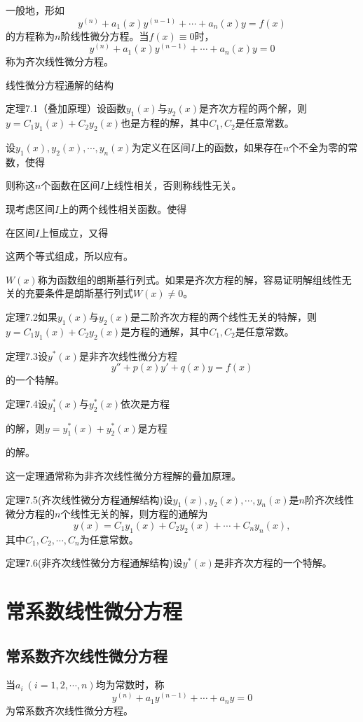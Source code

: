 一般地，形如
\[
y^{(n)}+a_1(x)y^{(n-1)}+\cdots+a_n(x)y=f(x)
\]
的方程称为$n$阶线性微分方程。当$f(x)\equiv0$时，
\[
y^{(n)}+a_1(x)y^{(n-1)}+\cdots+a_n(x)y=0
\]
称为齐次线性微分方程。

\noindent 线性微分方程通解的结构

定理7.1（叠加原理）\quad 设函数$y_1(x)$与$y_2(x)$是齐次方程的两个解，则$y=C_1y_1(x)+C_2y_2(x)$也是方程的解，其中$C_1,C_2$是任意常数。

设$y_1(x),y_2(x),\cdots,y_n(x)$为定义在区间$I$上的函数，如果存在$n$个不全为零的常数，使得

则称这$n$个函数在区间$I$上线性相关，否则称线性无关。

现考虑区间$I$上的两个线性相关函数。使得

在区间$I$上恒成立，又得

这两个等式组成，所以应有。

$W(x)$称为函数组的朗斯基行列式。如果是齐次方程的解，容易证明解组线性无关的充要条件是朗斯基行列式$W(x)\neq0$。

定理7.2\quad 如果$y_1(x)$与$y_2(x)$是二阶齐次方程的两个线性无关的特解，则$y=C_1y_1(x)+C_2y_2(x)$是方程的通解，其中$C_1,C_2$是任意常数。

定理7.3\quad 设$y^{*}(x)$是非齐次线性微分方程
\[
y''+p(x)y'+q(x)y=f(x)
\]
的一个特解。

定理7.4\quad 设$y_1^{*}(x)$与$y_2^{*}(x)$依次是方程

的解，则$y=y_1^{*}(x)+y_2^{*}(x)$是方程

的解。

这一定理通常称为非齐次线性微分方程解的叠加原理。

定理7.5(齐次线性微分方程通解结构)\quad 设$y_1(x),y_2(x),\cdots,y_n(x)$是$n$阶齐次线性微分方程的$n$个线性无关的解，则方程的通解为
\[
y(x)=C_1y_1(x)+C_2y_2(x)+\cdots+C_ny_n(x),
\]
其中$C_1,C_2,\cdots,C_n$为任意常数。

定理7.6(非齐次线性微分方程通解结构)\quad 设$y^{*}(x)$是非齐次方程的一个特解。

\section{常系数线性微分方程}
\subsection{常系数齐次线性微分方程}

当$a_i\ (i=1,2,\cdots,n)$均为常数时，称
\[
y^{(n)}+a_1y^{(n-1)}+\cdots+a_ny=0
\]
为常系数齐次线性微分方程。

